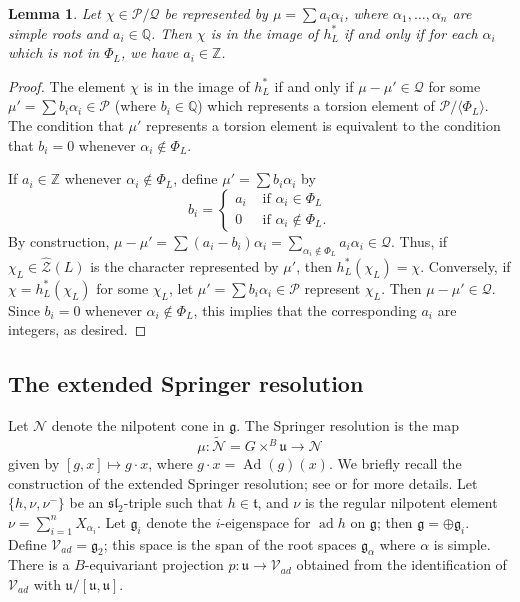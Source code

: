 \documentclass[reqno,11pt]{amsart}
\newtheorem{Lem}[Thm]{Lemma}
\theoremstyle{remark}
\theoremstyle{remark}
\theoremstyle{definition}
\theoremstyle{definition}
\theoremstyle{definition}
\numberwithin{equation}{section}
\newcommand{\Z}{\mathbb{ Z}}           %
\newcommand{\QQ}{\mathbb{ Q}}        %
\newcommand{\Ad}{\operatorname{Ad }}             %
\newcommand{\ad}{\operatorname{ad}}             %
\newcommand{\fg}{{\mathfrak g}}
\newcommand{\ft}{{\mathfrak t}}
\newcommand{\fu}{{\mathfrak u}}
\newcommand{\ga}{\alpha}
\newcommand{\cn}{\mathcal{N}}
\newcommand{\cp}{\mathcal{P}}
\newcommand{\cq}{\mathcal{Q}}
\newcommand{\cz}{\mathcal{Z}}
\newcommand{\toric}{\mathcal{V}}
\newcommand{\nilp}{\nu}
\renewcommand{\tilde}{\widetilde}
\begin{document}
\begin{Lem} \label{l:image}
Let $\chi \in \cp/\cq$ be represented by $\mu = \sum a_i \alpha_i$, where $\alpha_1, \ldots, \alpha_n$ are simple roots and $a_i \in \QQ$.  Then $\chi$ is in the image of $h_L^*$ if and only if for each $\alpha_i$ which is not in $\Phi_L$, we have $a_i \in \Z$.
\end{Lem}

\begin{proof}
The element $\chi$ is in the image of $h_L^*$ if and only if $\mu - \mu'\in \cq$ for some $\mu' = \sum b_i \alpha_i \in \cp$ (where $b_i \in \QQ$)  which represents a torsion element of $\cp/\langle \Phi_L \rangle$.
The condition that $\mu'$ represents a torsion element is equivalent to the condition that $b_i = 0$ whenever $\alpha_i \not\in \Phi_L$.  

If $a_i \in \Z $ whenever $\alpha_i \not\in \Phi_L$, define $\mu' =  \sum b_i \alpha_i$ by 
\[
b_i = \begin{cases}
a_i & \mbox{ if } \alpha_i \in \Phi_L \\
0 & \mbox{ if }  \alpha_i \not \in \Phi_L.
\end{cases}
\]
By construction, $\mu-\mu' = \sum (a_i-b_i) \alpha_i = \sum_{\alpha_i\notin \Phi_L} a_i \alpha_i \in \cq$. 
Thus, if $\chi_L \in \widehat{\cz}(L)$ is the character represented by $\mu'$, then $h_L^*(\chi_L) = \chi$.  Conversely, if $\chi = h_L^*(\chi_L)$ for some $\chi_L$, let $\mu' = \sum b_i \alpha_i \in \cp$ represent $\chi_L$.
Then $\mu - \mu' \in \cq$.  Since $b_i = 0$ whenever $\alpha_i \not\in \Phi_L$, this implies that the corresponding $a_i$ are
integers, as desired.
\end{proof}



\subsection{The extended Springer resolution}
Let $\cn$ denote the nilpotent cone in $\fg$. The Springer resolution is the map 
$$
\mu: \tilde{\cn} = G \times^B \fu \to \cn
$$
given by $[g,x] \mapsto g \cdot x$, where $g \cdot x = \Ad(g) (x)$.  
We briefly recall the construction of the extended Springer resolution; see \cite{Graham2022} or \cite{GPR23} for more details.  Let $\{h, \nilp, \nilp^- \}$ be an $\mathfrak{sl}_2$-triple such that $h \in \ft$, and $\nilp$ is the regular nilpotent element $\nilp = \sum_{i=1}^n X_{\ga_i}$.  Let $\fg_i$ denote the $i$-eigenspace for $\ad h$ on $\fg$; then $\fg = \oplus \fg_i$.  Define $\toric_{ad} = \mathfrak{g}_2$; this space is the span of the root spaces $\fg_{\ga}$ where $\ga$ is simple.   There is a $B$-equivariant projection $p:\fu \to \toric_{ad}$ obtained from the identification of $\toric_{ad}$ with $\fu/[\fu, \fu]$. 
 
\end{document}
